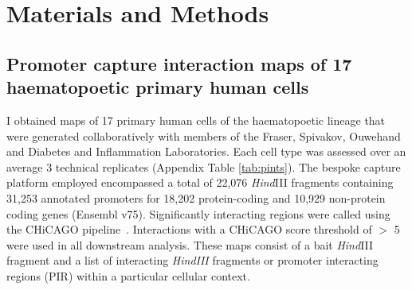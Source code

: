 \documentclass[a4paper,11pt]{report}
\begin{document}





\chapter{Materials and Methods}

\section{Promoter capture interaction maps of 17 haematopoetic primary human cells}
I obtained maps of 17 primary human cells of the haematopoetic lineage that were generated collaboratively with members of the Fraser, Spivakov, Ouwehand and Diabetes and Inflammation Laboratories. Each cell type was assessed over an average 3 technical replicates (Appendix Table \ref{tab:pints}). The bespoke capture platform employed encompassed a total of 22,076 \textit{Hind}III fragments containing 31,253 annotated promoters for 18,202 protein-coding and 10,929 non-protein coding genes (Ensembl v75). Significantly interacting regions were called using the CHiCAGO pipeline~\citep{CairnsFreire-PritchettWingettEtAl2016}. Interactions with a CHiCAGO score threshold of $>$ 5 were used in all downstream analysis. These maps consist of a bait \textit{Hind}III fragment and a list of interacting \textit{HindIII} fragments or promoter interacting regions (PIR) within a particular cellular context.
\end{document}
